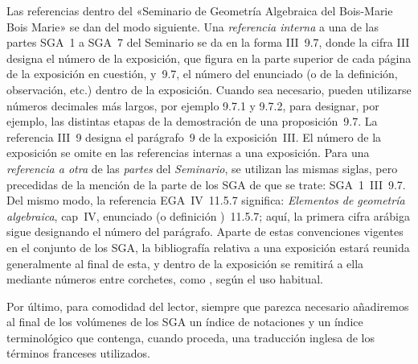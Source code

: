 Las referencias dentro del «Seminario de Geometría Algebraica del
{Bois-Marie}
{Bois Marie}» se dan del modo siguiente. Una \emph{referencia interna} a una de las partes SGA~1 a SGA~7 del Seminario se da en la forma III~9.7, donde la cifra III designa el número de la exposición, que figura en la parte superior de cada página de la exposición en cuestión, y~9.7, el número del enunciado (o de la definición, observación, etc.) dentro de la exposición. Cuando sea necesario, pueden utilizarse números decimales más largos, por ejemplo 9.7.1 y 9.7.2, para designar, por ejemplo, las distintas etapas de la demostración de una proposición~9.7. La referencia III~9 designa el parágrafo~9 de la exposición~III. El número de la exposición se omite en las referencias internas a una exposición. Para una \emph{referencia a otra} de las \emph{partes} del \emph{Seminario}, se utilizan las mismas siglas, pero precedidas de la mención de la parte de los SGA de que se trate: SGA~1~III~9.7. Del mismo modo, la referencia EGA~IV~11.5.7 significa: \emph{Elementos de geometría algebraica}, cap\ptbl\ IV, enunciado (o definición
)~11.5.7; aquí, la primera cifra arábiga sigue designando el número del parágrafo. Aparte de estas convenciones vigentes en el conjunto de los SGA, la bibliografía relativa a una exposición estará reunida generalmente al final de esta, y dentro de la exposición se remitirá a ella mediante números entre corchetes, como
, según el uso habitual.

Por último, para comodidad del lector, siempre que parezca necesario añadiremos al final de los volúmenes de los SGA un índice de notaciones y un índice terminológico que contenga, cuando proceda, una traducción inglesa de los términos franceses utilizados.


